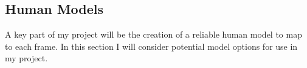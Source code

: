\subsection{Human Models}

A key part of my project will be the creation of a reliable human model to map to each frame. In this section I will consider potential model options for use in my project.



